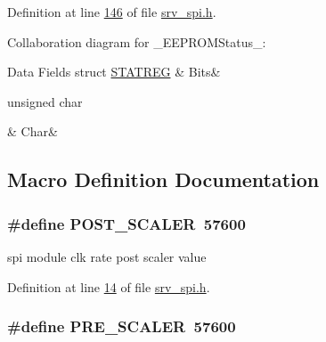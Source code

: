 Definition at line \hyperlink{a00007_source_l00146}{146} of file \hyperlink{a00007_source}{srv\+\_\+spi.\+h}.



Collaboration diagram for \+\_\+\+E\+E\+P\+R\+O\+M\+Status\+\_\+\+:
\begin{DoxyFields}{Data Fields}
\hypertarget{a00007_ab27a4d6dd2be64057b4adc7c0bdc4c07}{struct \hyperlink{a00007_dc/d0c/a00783}{S\+T\+A\+T\+R\+E\+G}}\label{a00007_ab27a4d6dd2be64057b4adc7c0bdc4c07}
&
Bits&
\\
\hline

\hypertarget{a00007_a4362ad9fde44c7f551e727c72cfa111b}{unsigned char}\label{a00007_a4362ad9fde44c7f551e727c72cfa111b}
&
Char&
\\
\hline

\end{DoxyFields}


\subsection{Macro Definition Documentation}
\hypertarget{a00007_a5df9b14c775d6e4eab17c79a729a4dbf}{
\subsubsection[{P\+O\+S\+T\+\_\+\+S\+C\+A\+L\+E\+R}]{\setlength{\rightskip}{0pt plus 5cm}\#define P\+O\+S\+T\+\_\+\+S\+C\+A\+L\+E\+R~57600}}\label{a00007_a5df9b14c775d6e4eab17c79a729a4dbf}


spi module clk rate post scaler value 



Definition at line \hyperlink{a00007_source_l00014}{14} of file \hyperlink{a00007_source}{srv\+\_\+spi.\+h}.

\hypertarget{a00007_a5c1fd7fa207a92f0b4b78d39bbd2f34b}{
\subsubsection[{P\+R\+E\+\_\+\+S\+C\+A\+L\+E\+R}]{\setlength{\rightskip}{0pt plus 5cm}\#define P\+R\+E\+\_\+\+S\+C\+A\+L\+E\+R~57600}}\label{a00007_a5c1fd7fa207a92f0b4b78d39bbd2f34b}


